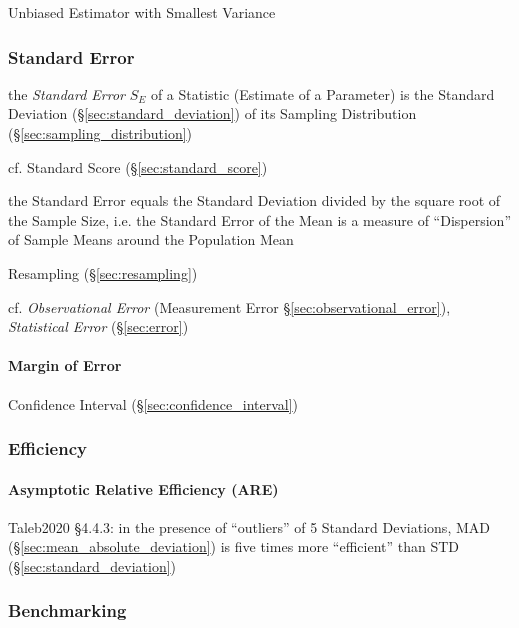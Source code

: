 Unbiased Estimator with Smallest Variance



\subsubsection{Standard Error}\label{sec:standard_error}

the \emph{Standard Error} $S_E$ of a Statistic (Estimate of a Parameter) is the
Standard Deviation (\S\ref{sec:standard_deviation}) of its Sampling Distribution
(\S\ref{sec:sampling_distribution})

cf. Standard Score (\S\ref{sec:standard_score})

the Standard Error equals the Standard Deviation divided by the square root of
the Sample Size, i.e. the Standard Error of the Mean is a measure of
``Dispersion'' of Sample Means around the Population Mean

\fist Resampling (\S\ref{sec:resampling})

\fist cf. \emph{Observational Error} (Measurement Error
\S\ref{sec:observational_error}), \emph{Statistical Error} (\S\ref{sec:error})



\paragraph{Margin of Error}\label{sec:margin_of_error}\hfill

\fist Confidence Interval (\S\ref{sec:confidence_interval})



\subsubsection{Efficiency}\label{sec:efficiency}

\paragraph{Asymptotic Relative Efficiency (ARE)}\label{sec:are}\hfill

Taleb2020 \S 4.4.3: in the presence of ``outliers'' of 5 Standard Deviations,
MAD (\S\ref{sec:mean_absolute_deviation}) is five times more ``efficient'' than
STD (\S\ref{sec:standard_deviation})



\subsubsection{Benchmarking}\label{sec:benchmarking}

